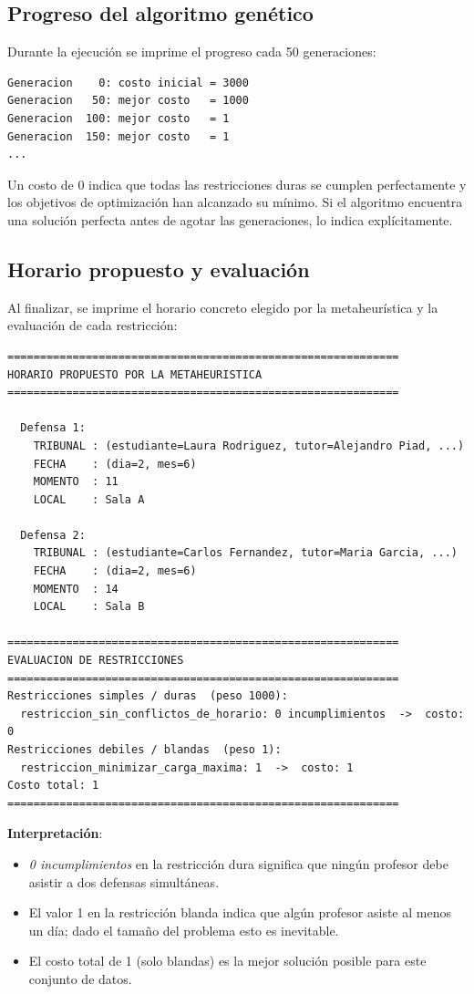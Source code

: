 \documentclass[12pt,a4paper]{article}
\begin{document}
\subsection{Progreso del algoritmo genético}

Durante la ejecución se imprime el progreso cada 50 generaciones:

\begin{lstlisting}[style=output]
Generacion    0: costo inicial = 3000
Generacion   50: mejor costo   = 1000
Generacion  100: mejor costo   = 1
Generacion  150: mejor costo   = 1
...
\end{lstlisting}

Un costo de 0 indica que todas las restricciones duras se cumplen
perfectamente y los objetivos de optimización han alcanzado su mínimo.
Si el algoritmo encuentra una solución perfecta antes de agotar las
generaciones, lo indica explícitamente.

\subsection{Horario propuesto y evaluación}

Al finalizar, se imprime el horario concreto elegido por la metaheurística
y la evaluación de cada restricción:

\begin{lstlisting}[style=output]
============================================================
HORARIO PROPUESTO POR LA METAHEURISTICA
============================================================

  Defensa 1:
    TRIBUNAL : (estudiante=Laura Rodriguez, tutor=Alejandro Piad, ...)
    FECHA    : (dia=2, mes=6)
    MOMENTO  : 11
    LOCAL    : Sala A

  Defensa 2:
    TRIBUNAL : (estudiante=Carlos Fernandez, tutor=Maria Garcia, ...)
    FECHA    : (dia=2, mes=6)
    MOMENTO  : 14
    LOCAL    : Sala B

============================================================
EVALUACION DE RESTRICCIONES
============================================================
Restricciones simples / duras  (peso 1000):
  restriccion_sin_conflictos_de_horario: 0 incumplimientos  ->  costo: 0
Restricciones debiles / blandas  (peso 1):
  restriccion_minimizar_carga_maxima: 1  ->  costo: 1
Costo total: 1
============================================================
\end{lstlisting}

\textbf{Interpretación}:
\begin{itemize}
  \item \textit{0 incumplimientos} en la restricción dura significa que
    ningún profesor debe asistir a dos defensas simultáneas.
  \item El valor 1 en la restricción blanda indica que algún profesor
    asiste al menos un día; dado el tamaño del problema esto es inevitable.
  \item El costo total de 1 (solo blandas) es la mejor solución posible
    para este conjunto de datos.
\end{itemize}
\end{document}
